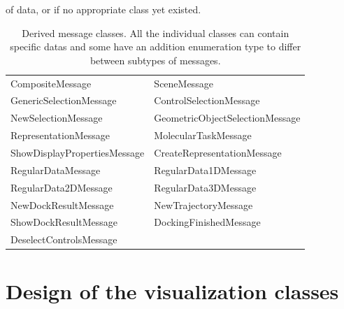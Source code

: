 of data, or if no appropriate class yet existed.
\begin{table} [ht] %
\centering
\begin{tabular} {|l|l|}
\hline
CompositeMessage & SceneMessage\\
GenericSelectionMessage & ControlSelectionMessage\\
NewSelectionMessage & GeometricObjectSelectionMessage\\
RepresentationMessage & MolecularTaskMessage\\
ShowDisplayPropertiesMessage & CreateRepresentationMessage\\
RegularDataMessage & RegularData1DMessage \\
RegularData2DMessage & RegularData3DMessage\\
NewDockResultMessage & NewTrajectoryMessage\\
ShowDockResultMessage & DockingFinishedMessage\\
DeselectControlsMessage & \\
\hline
\end{tabular}
\caption{Derived message classes. 
All the individual classes can contain specific datas and some have an addition enumeration 
type to differ between subtypes of messages.}
\label{tab:messages}
\end{table}
%
\section{Design of the visualization classes}
